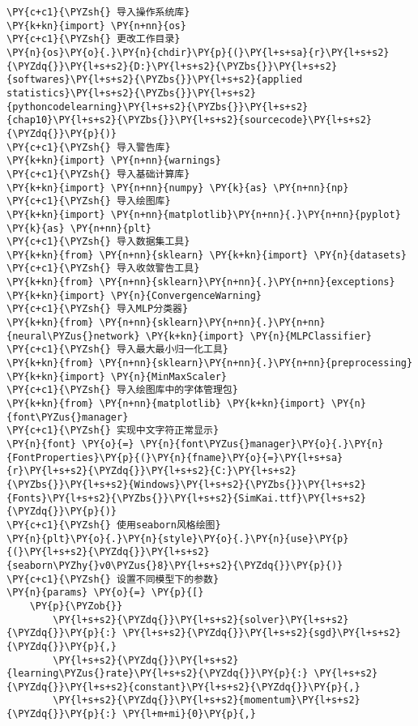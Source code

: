 \begin{Verbatim}[commandchars=\\\{\}]
\PY{c+c1}{\PYZsh{} 导入操作系统库}
\PY{k+kn}{import} \PY{n+nn}{os}
\PY{c+c1}{\PYZsh{} 更改工作目录}
\PY{n}{os}\PY{o}{.}\PY{n}{chdir}\PY{p}{(}\PY{l+s+sa}{r}\PY{l+s+s2}{\PYZdq{}}\PY{l+s+s2}{D:}\PY{l+s+s2}{\PYZbs{}}\PY{l+s+s2}{softwares}\PY{l+s+s2}{\PYZbs{}}\PY{l+s+s2}{applied statistics}\PY{l+s+s2}{\PYZbs{}}\PY{l+s+s2}{pythoncodelearning}\PY{l+s+s2}{\PYZbs{}}\PY{l+s+s2}{chap10}\PY{l+s+s2}{\PYZbs{}}\PY{l+s+s2}{sourcecode}\PY{l+s+s2}{\PYZdq{}}\PY{p}{)}
\PY{c+c1}{\PYZsh{} 导入警告库}
\PY{k+kn}{import} \PY{n+nn}{warnings}
\PY{c+c1}{\PYZsh{} 导入基础计算库}
\PY{k+kn}{import} \PY{n+nn}{numpy} \PY{k}{as} \PY{n+nn}{np}
\PY{c+c1}{\PYZsh{} 导入绘图库}
\PY{k+kn}{import} \PY{n+nn}{matplotlib}\PY{n+nn}{.}\PY{n+nn}{pyplot} \PY{k}{as} \PY{n+nn}{plt}
\PY{c+c1}{\PYZsh{} 导入数据集工具}
\PY{k+kn}{from} \PY{n+nn}{sklearn} \PY{k+kn}{import} \PY{n}{datasets}
\PY{c+c1}{\PYZsh{} 导入收敛警告工具}
\PY{k+kn}{from} \PY{n+nn}{sklearn}\PY{n+nn}{.}\PY{n+nn}{exceptions} \PY{k+kn}{import} \PY{n}{ConvergenceWarning}
\PY{c+c1}{\PYZsh{} 导入MLP分类器}
\PY{k+kn}{from} \PY{n+nn}{sklearn}\PY{n+nn}{.}\PY{n+nn}{neural\PYZus{}network} \PY{k+kn}{import} \PY{n}{MLPClassifier}
\PY{c+c1}{\PYZsh{} 导入最大最小归一化工具}
\PY{k+kn}{from} \PY{n+nn}{sklearn}\PY{n+nn}{.}\PY{n+nn}{preprocessing} \PY{k+kn}{import} \PY{n}{MinMaxScaler}
\PY{c+c1}{\PYZsh{} 导入绘图库中的字体管理包}
\PY{k+kn}{from} \PY{n+nn}{matplotlib} \PY{k+kn}{import} \PY{n}{font\PYZus{}manager}
\PY{c+c1}{\PYZsh{} 实现中文字符正常显示}
\PY{n}{font} \PY{o}{=} \PY{n}{font\PYZus{}manager}\PY{o}{.}\PY{n}{FontProperties}\PY{p}{(}\PY{n}{fname}\PY{o}{=}\PY{l+s+sa}{r}\PY{l+s+s2}{\PYZdq{}}\PY{l+s+s2}{C:}\PY{l+s+s2}{\PYZbs{}}\PY{l+s+s2}{Windows}\PY{l+s+s2}{\PYZbs{}}\PY{l+s+s2}{Fonts}\PY{l+s+s2}{\PYZbs{}}\PY{l+s+s2}{SimKai.ttf}\PY{l+s+s2}{\PYZdq{}}\PY{p}{)}
\PY{c+c1}{\PYZsh{} 使用seaborn风格绘图}
\PY{n}{plt}\PY{o}{.}\PY{n}{style}\PY{o}{.}\PY{n}{use}\PY{p}{(}\PY{l+s+s2}{\PYZdq{}}\PY{l+s+s2}{seaborn\PYZhy{}v0\PYZus{}8}\PY{l+s+s2}{\PYZdq{}}\PY{p}{)}
\PY{c+c1}{\PYZsh{} 设置不同模型下的参数}
\PY{n}{params} \PY{o}{=} \PY{p}{[}
    \PY{p}{\PYZob{}}
        \PY{l+s+s2}{\PYZdq{}}\PY{l+s+s2}{solver}\PY{l+s+s2}{\PYZdq{}}\PY{p}{:} \PY{l+s+s2}{\PYZdq{}}\PY{l+s+s2}{sgd}\PY{l+s+s2}{\PYZdq{}}\PY{p}{,}
        \PY{l+s+s2}{\PYZdq{}}\PY{l+s+s2}{learning\PYZus{}rate}\PY{l+s+s2}{\PYZdq{}}\PY{p}{:} \PY{l+s+s2}{\PYZdq{}}\PY{l+s+s2}{constant}\PY{l+s+s2}{\PYZdq{}}\PY{p}{,}
        \PY{l+s+s2}{\PYZdq{}}\PY{l+s+s2}{momentum}\PY{l+s+s2}{\PYZdq{}}\PY{p}{:} \PY{l+m+mi}{0}\PY{p}{,}

\end{Verbatim}
